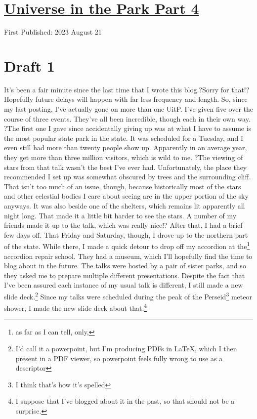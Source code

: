 \documentclass[12pt]{article}[titlepage]
\newcommand{\1}{\={a}}
\newcommand{\2}{\={e}}
\newcommand{\3}{\={\i}}
\newcommand{\4}{\=o}
\newcommand{\5}{\=u}
\newcommand{\6}{\={A}}
\renewcommand{\,}{\textsuperscript{,}}
\begin{document}
\doublespacing
\section{\href{universe-4.html}{Universe in the Park Part 4}}
First Published: 2023 August 21
\section{Draft 1}
It's been a fair minute since the last time that I wrote this blog.?Sorry for that!?Hopefully future delays will happen with far less frequency and length.
So, since my last posting, I've actually gone on more than one UitP.
I've given five over the course of three events.
They've all been incredible, though each in their own way.
?The first one I gave since accidentally giving up was at what I have to assume is the most popular state park in the state.
It was scheduled for a Tuesday, and I even still had more than twenty people show up.
Apparently in an average year, they get more than three million visitors, which is wild to me.
?The viewing of stars from that talk wasn't the best I've ever had.
Unfortunately, the place they recommended I set up was somewhat obscured by trees and the surrounding cliff.
That isn't too much of an issue, though, because historically most of the stars and other celestial bodies I care about seeing are in the upper portion of the sky anyways.
It was also beside one of the shelters, which remains lit apparently all night long.
That made it a little bit harder to see the stars.
A number of my friends made it up to the talk, which was really nice!?
After that, I had a brief few days off.
That Friday and Saturday, though, I drove up to the northern part of the state.
While there, I made a quick detour to drop off my accordion at the\footnote{as far as I can tell, only,} accordion repair school.
They had a museum, which I'll hopefully find the time to blog about in the future.
The talks were hosted by a pair of sister parks, and so they asked me to prepare multiple different presentations.
Despite the fact that I've been assured each instance of my usual talk is different, I still made a new slide deck.\footnote{I'd call it a powerpoint, but I'm producing PDFs in LaTeX, which I then present in a PDF viewer, so powerpoint feels fully wrong to use as a descriptor}
Since my talks were scheduled during the peak of the Perseid\footnote{I think that's how it's spelled} meteor shower, I made the new slide deck about that.\footnote{I suppose that I've blogged about it in the past, so that should not be a surprise.}
\end{document}
